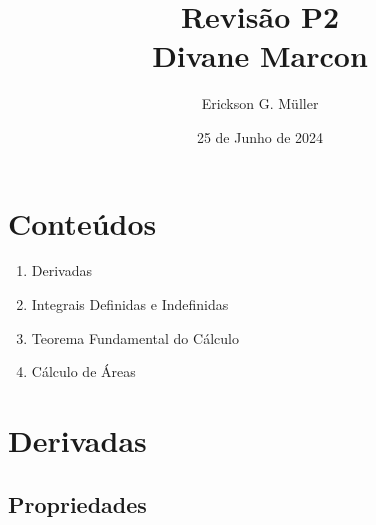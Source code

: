 \documentclass[ ]{article}
\title{Revisão P2 \\ Divane Marcon}
\author{Erickson G. Müller}
\date{25 de Junho de 2024}
\begin{document}
\maketitle

\section{Conteúdos}
	\begin{enumerate}
		\item Derivadas
		\item Integrais Definidas e Indefinidas
		\item Teorema Fundamental do Cálculo
		\item Cálculo de Áreas
	\end{enumerate}
\pagebreak

\section{Derivadas}
	\subsection{Propriedades}
	
\end{document}
